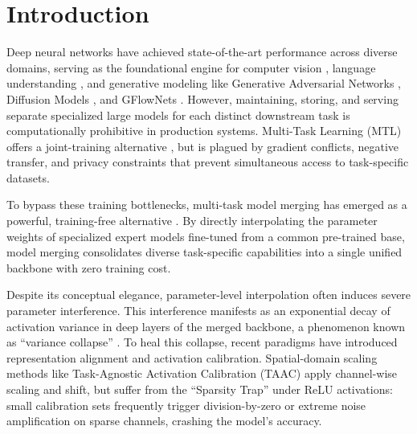 \documentclass{article}
\theoremstyle{plain}
\theoremstyle{definition}
\theoremstyle{remark}
\begin{document}
\section{Introduction}
\label{submission-introduction}
Deep neural networks have achieved state-of-the-art performance across diverse domains, serving as the foundational engine for computer vision \cite{he2016deep, simonyan2014vgg, szegedy2015going, huang2017densely, krizhevsky2009learning, lecun1998gradient, dosovitskiy2020vit, liu2021swin, redmon2016yolo, ren2015faster, ronneberger2015unet, he2017mask}, language understanding \cite{vaswani2017attention, devlin2018bert, radford2018gpt1, radford2019gpt2, brown2020gpt3, touvron2023llama, touvron2023llama2}, and generative modeling like Generative Adversarial Networks \cite{goodfellow2014gan}, Diffusion Models \cite{ho2020diffusion}, and GFlowNets \cite{malkin2022gfn}. However, maintaining, storing, and serving separate specialized large models for each distinct downstream task is computationally prohibitive in production systems. Multi-Task Learning (MTL) offers a joint-training alternative \cite{caruana1997multitask, sener2018multi}, but is plagued by gradient conflicts, negative transfer, and privacy constraints that prevent simultaneous access to task-specific datasets.

To bypass these training bottlenecks, multi-task model merging has emerged as a powerful, training-free alternative \cite{wortsman2022model, ilharco2023editing, yadav2023ties, yu2024language}. By directly interpolating the parameter weights of specialized expert models fine-tuned from a common pre-trained base, model merging consolidates diverse task-specific capabilities into a single unified backbone with zero training cost. 

Despite its conceptual elegance, parameter-level interpolation often induces severe parameter interference. This interference manifests as an exponential decay of activation variance in deep layers of the merged backbone, a phenomenon known as ``variance collapse'' \cite{jordan2022repair, anonymous2026taac}. To heal this collapse, recent paradigms have introduced representation alignment and activation calibration. Spatial-domain scaling methods like Task-Agnostic Activation Calibration (TAAC) \cite{anonymous2026taac} apply channel-wise scaling and shift, but suffer from the ``Sparsity Trap'' under ReLU activations: small calibration sets frequently trigger division-by-zero or extreme noise amplification on sparse channels, crashing the model's accuracy. 
\end{document}
